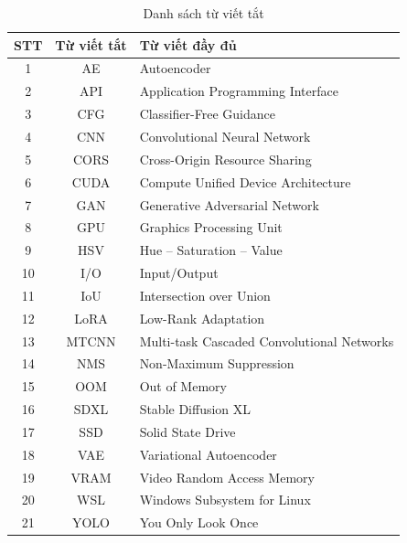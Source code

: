 \documentclass[../main.tex]{subfiles}
\begin{document}
\begin{table}[H]
\centering
\caption{Danh sách từ viết tắt}
\begin{tabularx}{\textwidth}{|c|c|X|}
\hline
\textbf{STT} & \textbf{Từ viết tắt} & \textbf{Từ viết đầy đủ} \\
\hline
1 & AE & Autoencoder \\
\hline
2 & API & Application Programming Interface \\
\hline
3 & CFG & Classifier-Free Guidance \\
\hline
4 & CNN & Convolutional Neural Network \\
\hline
5 & CORS & Cross-Origin Resource Sharing \\
\hline
6 & CUDA & Compute Unified Device Architecture \\
\hline
7 & GAN & Generative Adversarial Network \\
\hline
8 & GPU & Graphics Processing Unit \\
\hline
9 & HSV & Hue -- Saturation -- Value \\
\hline
10 & I/O & Input/Output \\
\hline
11 & IoU & Intersection over Union \\
\hline
12 & LoRA & Low-Rank Adaptation \\
\hline
13 & MTCNN & Multi-task Cascaded Convolutional Networks \\
\hline
14 & NMS & Non-Maximum Suppression \\
\hline
15 & OOM & Out of Memory \\
\hline
16 & SDXL & Stable Diffusion XL \\
\hline
17 & SSD & Solid State Drive \\
\hline
18 & VAE & Variational Autoencoder \\
\hline
19 & VRAM & Video Random Access Memory \\
\hline
20 & WSL & Windows Subsystem for Linux \\
\hline
21 & YOLO & You Only Look Once \\
\hline
\end{tabularx}
\label{tab:abbreviation}
\end{table}
\end{document}
